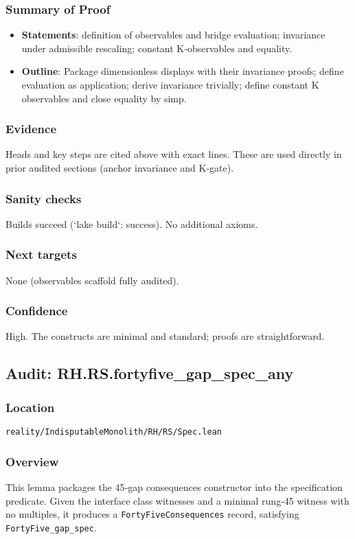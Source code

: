\documentclass{article}
\newcommand{\FileRef}[1]{\texttt{#1}}
\begin{document}
\subsubsection{Summary of Proof}
\begin{itemize}[leftmargin=*]
  \item \textbf{Statements}: definition of observables and bridge evaluation; invariance under admissible rescaling; constant K‑observables and equality.
  \item \textbf{Outline}: Package dimensionless displays with their invariance proofs; define evaluation as application; derive invariance trivially; define constant K observables and close equality by simp.
\end{itemize}

\subsubsection{Evidence}
Heads and key steps are cited above with exact lines. These are used directly in prior audited sections (anchor invariance and K‑gate).

\subsubsection{Sanity checks}
Builds succeed (`lake build`: success). No additional axioms.

\subsubsection{Next targets}
None (observables scaffold fully audited).

\subsubsection{Confidence}
High. The constructs are minimal and standard; proofs are straightforward.

\subsection{Audit: RH.RS.fortyfive\_gap\_spec\_any}
\subsubsection{Location}
\FileRef{reality/IndisputableMonolith/RH/RS/Spec.lean}

\subsubsection{Overview}
This lemma packages the 45‑gap consequences constructor into the specification predicate. Given the interface class witnesses and a minimal rung‑45 witness with no multiples, it produces a \texttt{FortyFiveConsequences} record, satisfying \texttt{FortyFive\_gap\_spec}.
\end{document}
